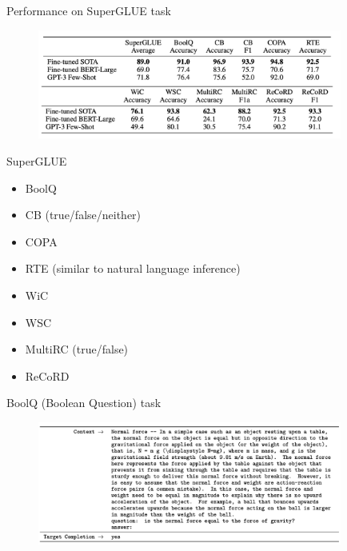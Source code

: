 
\begin{vbframe}{Performance on SuperGLUE task}

\vfill

	\begin{figure}
		\centering
		\includegraphics[width=10cm]{figure/superglueperf.png}
	\end{figure}

\vfill

\end{vbframe}




\begin{vbframe}{SuperGLUE}

\vfill

  \begin{itemize}
\item BoolQ
\item CB (true/false/neither)
\item COPA
\item RTE (similar to natural language inference)
\item WiC 
\item WSC
\item MultiRC (true/false)
\item ReCoRD 
    \end{itemize}

\vfill

\end{vbframe}




\begin{vbframe}{BoolQ (Boolean Question) task}

\vfill

	\begin{figure}
		\centering
		\includegraphics[width=10cm]{figure/boolqtask.png}
	\end{figure}

\vfill

\end{vbframe}



